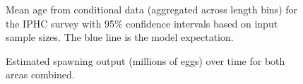 \documentclass[
]{scrartcl}
\begin{document}
\begin{figure}


\caption{\label{fig-mean-age-12}Mean age from conditional data
(aggregated across length bins) for the IPHC survey with 95\% confidence
intervals based on input sample sizes. The blue line is the model
expectation.}

\end{figure}%

\begin{figure}


\caption{\label{fig-spout_combined}Estimated spawning output (millions
of eggs) over time for both areas combined.}

\end{figure}%
\end{document}

